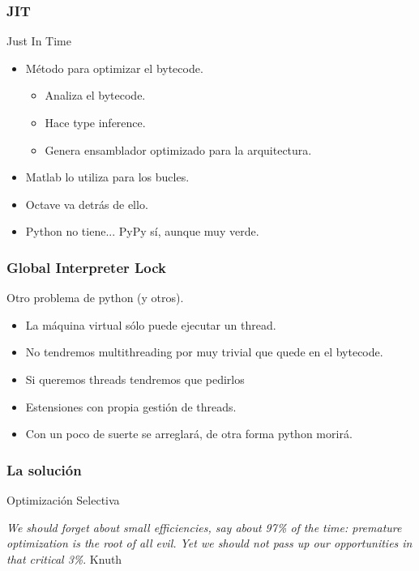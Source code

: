 \documentclass{beamer}
\begin{document}
\begin{frame}
  \frametitle{JIT}
  Just In Time
  \begin{itemize}
  \item Método para optimizar el bytecode.
    \begin{itemize}
    \item Analiza el bytecode.
    \item Hace type inference.
    \item Genera ensamblador optimizado para la arquitectura.
    \end{itemize}
  \item Matlab lo utiliza para los bucles.
  \item Octave va detrás de ello.
  \item Python no tiene... PyPy sí, aunque muy verde.
  \end{itemize}
\end{frame}

\begin{frame}
  \frametitle{Global Interpreter Lock}
  Otro problema de python (y otros).
  \begin{itemize}
  \item La máquina virtual sólo puede ejecutar un thread.
  \item No tendremos multithreading por muy trivial que quede en el
    bytecode.
  \item Si queremos threads tendremos que pedirlos
  \item Estensiones con propia gestión de threads.
  \item Con un poco de suerte se arreglará, de otra forma python
    morirá.
  \end{itemize}
\end{frame}

\begin{frame}
  \frametitle{La solución}
  \begin{center}
    \begin{Huge}
      Optimización Selectiva
    \end{Huge}
  \end{center}
  \vspace{1cm}
  \begin{flushright}
    \textit{We should forget about small efficiencies, say about 97\%
      of the time: premature optimization is the root of all evil. Yet
      we should not pass up our opportunities in that critical 3\%}. Knuth
  \end{flushright}
\end{frame}
\end{document}
